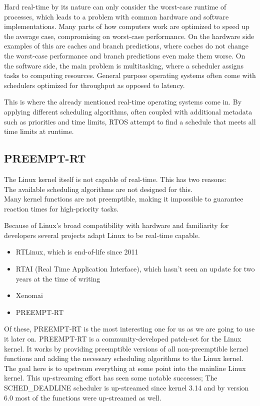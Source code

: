 Hard real-time by its nature can only consider the worst-case runtime of processes,
which leads to a problem with common hardware and software implementations.
Many parts of how computers work are optimized to speed up the average case, compromising on worst-case performance.
On the hardware side examples of this are caches and branch predictions, where caches do not change the worst-case performance and branch predictions even make them worse.
On the software side, the main problem is multitasking, where a scheduler assigns tasks to computing resources.
General purpose operating systems often come with schedulers optimized for throughput as opposed to latency.

This is where the already mentioned real-time operating systems come in.
By applying different scheduling algorithms,
often coupled with additional metadata such as priorities and time limits,
RTOS attempt to find a schedule that meets all time limits at runtime.

\subsection{PREEMPT-RT}
\label{sec:background:bm_vs_os:preempt_rt}

The Linux kernel itself is not capable of real-time.
This has two reasons:\\
The available scheduling algorithms are not designed for this.\\
Many kernel functions are not preemptible, making it impossible to guarantee reaction times for high-priority tasks.

Because of Linux's broad compatibility with hardware and familiarity for developers several projects adapt Linux to be real-time capable.
\begin{itemize}
    \item RTLinux, which is end-of-life since 2011
    \item RTAI (Real Time Application Interface), which hasn't seen an update for two years at the time of writing \cite{RTAI}
    \item Xenomai \cite{Xenomai}
    \item PREEMPT-RT \cite{PREEMPT-RT}
\end{itemize}

Of these, PREEMPT-RT is the most interesting one for us as we are going to use it later on.
PREEMPT-RT is a community-developed patch-set for the Linux kernel.
It works by providing preemptible versions of all non-preemptible kernel functions
and adding the necessary scheduling algorithms to the Linux kernel.
The goal here is to upstream everything at some point into the mainline Linux kernel.
This up-streaming effort has seen some notable successes;
The SCHED\_DEADLINE scheduler is up-streamed since kernel 3.14 and by version 6.0 most of the functions were up-streamed as well.

